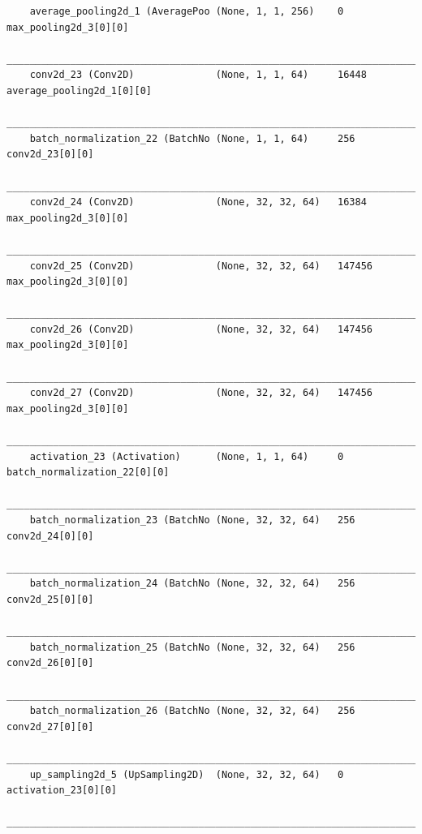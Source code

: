 {\begin{verbatim}
    average_pooling2d_1 (AveragePoo (None, 1, 1, 256)    0           max_pooling2d_3[0][0]            
    __________________________________________________________________________________________________
    conv2d_23 (Conv2D)              (None, 1, 1, 64)     16448       average_pooling2d_1[0][0]        
    __________________________________________________________________________________________________
    batch_normalization_22 (BatchNo (None, 1, 1, 64)     256         conv2d_23[0][0]                  
    __________________________________________________________________________________________________
    conv2d_24 (Conv2D)              (None, 32, 32, 64)   16384       max_pooling2d_3[0][0]            
    __________________________________________________________________________________________________
    conv2d_25 (Conv2D)              (None, 32, 32, 64)   147456      max_pooling2d_3[0][0]            
    __________________________________________________________________________________________________
    conv2d_26 (Conv2D)              (None, 32, 32, 64)   147456      max_pooling2d_3[0][0]            
    __________________________________________________________________________________________________
    conv2d_27 (Conv2D)              (None, 32, 32, 64)   147456      max_pooling2d_3[0][0]            
    __________________________________________________________________________________________________
    activation_23 (Activation)      (None, 1, 1, 64)     0           batch_normalization_22[0][0]     
    __________________________________________________________________________________________________
    batch_normalization_23 (BatchNo (None, 32, 32, 64)   256         conv2d_24[0][0]                  
    __________________________________________________________________________________________________
    batch_normalization_24 (BatchNo (None, 32, 32, 64)   256         conv2d_25[0][0]                  
    __________________________________________________________________________________________________
    batch_normalization_25 (BatchNo (None, 32, 32, 64)   256         conv2d_26[0][0]                  
    __________________________________________________________________________________________________
    batch_normalization_26 (BatchNo (None, 32, 32, 64)   256         conv2d_27[0][0]                  
    __________________________________________________________________________________________________
    up_sampling2d_5 (UpSampling2D)  (None, 32, 32, 64)   0           activation_23[0][0]              
    __________________________________________________________________________________________________

\end{verbatim}}
